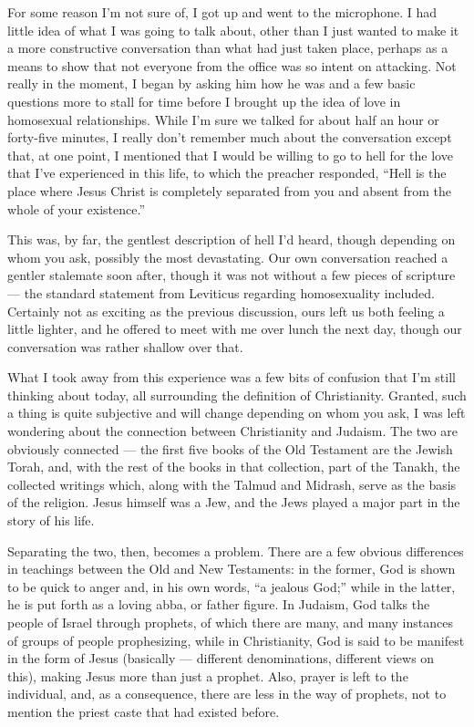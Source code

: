 For some reason I'm not sure of, I got up and went to the microphone. I had little idea of what I was going to talk about, other than I just wanted to make it a more constructive conversation than what had just taken place, perhaps as a means to show that not everyone from the office was so intent on attacking. Not really in the moment, I began by asking him how he was and a few basic questions more to stall for time before I brought up the idea of love in homosexual relationships. While I'm sure we talked for about half an hour or forty-five minutes, I really don't remember much about the conversation except that, at one point, I mentioned that I would be willing to go to hell for the love that I've experienced in this life, to which the preacher responded, ``Hell is the place where Jesus Christ is completely separated from you and absent from the whole of your existence.''

This was, by far, the gentlest description of hell I'd heard, though depending on whom you ask, possibly the most devastating. Our own conversation reached a gentler stalemate soon after, though it was not without a few pieces of scripture --- the standard statement from Leviticus regarding homosexuality included. Certainly not as exciting as the previous discussion, ours left us both feeling a little lighter, and he offered to meet with me over lunch the next day, though our conversation was rather shallow over that.

What I took away from this experience was a few bits of confusion that I'm still thinking about today, all surrounding the definition of Christianity. Granted, such a thing is quite subjective and will change depending on whom you ask, I was left wondering about the connection between Christianity and Judaism. The two are obviously connected --- the first five books of the Old Testament are the Jewish Torah, and, with the rest of the books in that collection, part of the Tanakh, the collected writings which, along with the Talmud and Midrash, serve as the basis of the religion. Jesus himself was a Jew, and the Jews played a major part in the story of his life.

Separating the two, then, becomes a problem. There are a few obvious differences in teachings between the Old and New Testaments: in the former, God is shown to be quick to anger and, in his own words, ``a jealous God;'' while in the latter, he is put forth as a loving abba, or father figure. In Judaism, God talks the people of Israel through prophets, of which there are many, and many instances of groups of people prophesizing, while in Christianity, God is said to be manifest in the form of Jesus (basically --- different denominations, different views on this), making Jesus more than just a prophet. Also, prayer is left to the individual, and, as a consequence, there are less in the way of prophets, not to mention the priest caste that had existed before.


